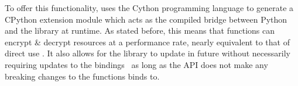 To offer this functionality, \PyOpenABE uses the Cython programming language to generate a CPython extension module which acts as the compiled bridge between Python and the \OpenABE library at runtime. As stated before, this means that \PyOpenABE functions can encrypt \& decrypt resources at a performance rate, nearly equivalent to that of direct \OpenABE use \citep{Akinyele2011}. It also allows for the \OpenABE library to update in future without necessarily requiring updates to the \PyOpenABE bindings \textemdash\ as long as the \OpenABE API does not make any breaking changes to the functions \PyOpenABE binds to.
